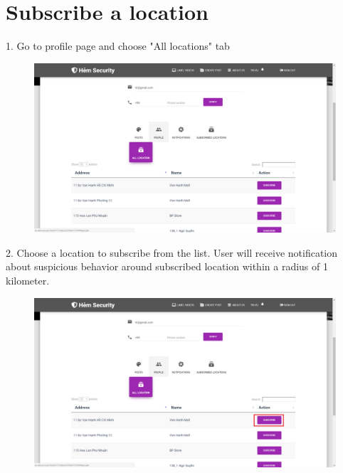 \section{Subscribe a location}
1. Go to profile page and choose "All locations" tab
\begin{center}
	\begin{figure}[H]
		\centering
		\includegraphics[width=1\columnwidth]{images/chap6/instruction9.png}
	\end{figure}
\end{center}
2. Choose a location to subscribe from the list. User will receive notification about suspicious behavior around subscribed location within a radius of 1 kilometer.   
\begin{center}
	\begin{figure}[H]
		\centering
		\includegraphics[width=1\columnwidth]{images/chap6/instruction10.png}
	\end{figure}
\end{center}